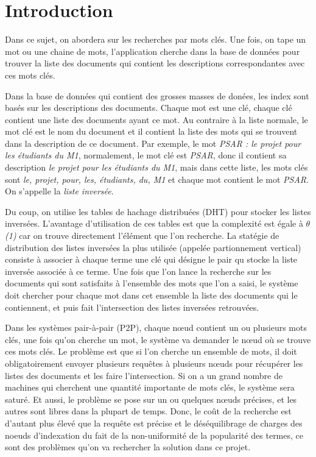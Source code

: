 
\chapter{Introduction}
	{\Huge D}ans ce sujet, on abordera sur les recherches par mots clés. Une fois, on tape un mot ou une chaine de mots, l'application cherche dans la base de données pour trouver la liste des documents qui contient les descriptions correspondantes avec ces mots clés.
	
	Dans la base de données qui contient des grosses masses de donées, les index sont basés sur les descriptions des documents. Chaque mot est une clé, chaque clé contient une liste des documents ayant ce mot. Au contraire à la liste normale, le mot clé est le nom du document et il contient la liste des mots qui se trouvent dans la description de ce document. Par exemple, le mot {\em PSAR : le projet pour les étudiants du M1}, normalement, le mot clé est {\em PSAR}, donc il contient sa description {\em le projet pour les étudiants du M1}, mais dans cette liste, les mots clés sont {\em le, projet, pour, les, étudiants, du, M1} et chaque mot contient le mot {\em PSAR}. On s'appelle la {\em liste inversée}.
	
	Du coup, on utilise les tables de hachage distribuées (DHT) pour stocker les listes inversées. L'avantage d'utilisation de ces tables est que la complexité est égale à $ \theta ${\em (1)} car on trouve directement l'élément que l'on recherche. La statégie de distribution des listes inversées la plus utilisée (appelée partionnement vertical) consiste à associer à chaque terme une clé qui désigne le pair qu stocke la liste inversée associée à ce terme. Une fois que l'on lance la recherche sur les documents qui sont satisfaits à l'ensemble des mots que l'on a saisi, le système doit chercher pour chaque mot dans cet ensemble la liste des documents qui le contiennent, et puis fait l'intersection des listes inversées retrouvées. 

	Dans les systèmes pair-à-pair (P2P), chaque n{\oe}ud contient un ou plusieurs mots clés, une fois qu'on cherche un mot, le système va demander le n{\oe}ud où se trouve ces mots clés. Le problème est que si l'on cherche un ensemble de mots, il doit obligatoirement envoyer plusieurs requêtes à plusieurs n{\oe}uds pour récupérer les listes des documents et les faire l'intersection. Si on a un grand nombre de machines qui cherchent une quantité importante de mots clés, le système sera saturé. Et aussi, le problème se pose sur un ou quelques n{\oe}uds précises, et les autres sont libres dans la plupart de temps. Donc, le coût de la recherche est d'autant plus élevé que la requête est précise et le déséquilibrage de charges des noeuds d'indexation du fait de la non-uniformité de la popularité des termes, ce sont des problèmes qu'on va rechercher la solution dans ce projet.
	
	